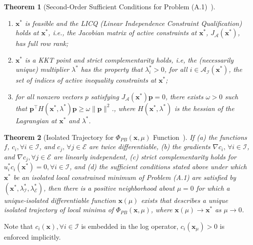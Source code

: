 \documentclass{article}
\newcommand{\itl}{\intercal}
\newcommand{\bs}{ \boldsymbol}
\newcommand{\lt}{\left}
\newcommand{\rt}{\right}
\newtheorem{theorem}{Theorem}[section]
\begin{document}
\begin{appendices}
\begin{theorem}[Second-Order Sufficient Conditions for Problem (A.1)~\cite{fiacco, Forsgren2002}]
	\begin{enumerate}
		\item $\bs{x}^*$ is feasible and the LICQ (Linear Independence Constraint Qualification) holds at $\bs{x}^*$, i.e., the Jacobian matrix of active constraints at $\bs{x}^*$, $J_{\mathcal{A}}(\bs{x}^*)$, has full row rank;
		\item $\bs{x}^*$ is a KKT point and strict complementarity holds, i.e, the (necessarily unique) multiplier $\lambda^*$ has the property that $\lambda_i^* > 0$, for all $i  \in \mathcal{A}_{\mathcal{I}}(\bs{x}^*)$, the set of indices of active inequality constraints at $\bs{x}^*$;
		\item for all nonzero vectors $p$ satisfying $J_{\mathcal{A}}(\bs{x}^*)\bs{p} = 0$, there exists $\omega > 0$ such that $\bs{p}^{\itl}H(\bs{x}^*, \lambda^*) \bs{p} \ge \omega \|\bs{p}\|^2$., where $H(\bs{x}^*, \lambda^*) $ is the hessian of the Lagrangian at $\bs{x}^*$ and $\lambda^*$.
	\end{enumerate}
\end{theorem}
\begin{theorem}[Isolated Trajectory for $\Phi_{PB}(\bs{x}, \mu)$ Function~\cite{fiacco, Forsgren2002}]
	If (a) the functions $f$, $c_i, \forall i \in \mathcal{I}$, and $c_j, \,\forall j \in \mathcal{E}$ are twice differentiable, (b) the gradients $\nabla c_i, \,\forall i \in \mathcal{I}$, and $\nabla c_j, \forall j \in \mathcal{E}$ are linearly independent, (c) strict complementarity holds for  $u_i^* c_i (\bs{x}^*) = 0, \forall i \in \mathcal{I}$, and (d) the sufficient conditions stated above under which $\bs{x}^*$ be an isolated local constrained minimum of Problem (A.1) are satisfied by $\lt(\bs{x}^*, \lambda_{\mathcal{I}}^*, \lambda_{\mathcal{E}}^*\rt)$, then there is a positive neighborhood about $\mu = 0$ for which a unique-isolated differentiable function $\bs{x}(\mu)$ exists that describes a unique isolated trajectory of local minima of $\Phi_{PB}\lt(\bs{x}, \mu\rt)$, where $\bs{x}\lt(\mu\rt) \to \bs{x}^*$ as $\mu \to 0$.
\end{theorem}
Note that $c_i\lt(\bs{x}\rt), \forall i \in \mathcal{I}$ is embedded  in the log operator, $c_i(\bs{x}_\mu)> 0$ is enforced implicitly.

\end{appendices}
\end{document}
